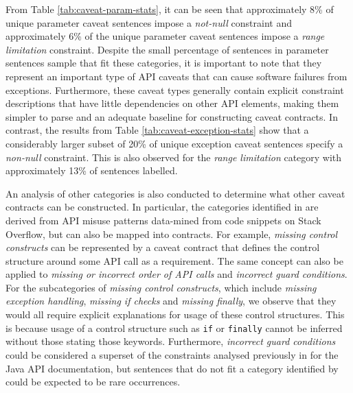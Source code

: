 From Table \ref{tab:caveat-param-stats}, it can be seen that approximately 8\% of unique parameter caveat sentences impose a \textit{not-null} constraint and approximately 6\% of the unique parameter caveat sentences impose a \textit{range limitation} constraint. Despite the small percentage of sentences in parameter sentences sample that fit these categories, it is important to note that they represent an important type of API caveats that can cause software failures from exceptions. Furthermore, these caveat types generally contain explicit constraint descriptions that have little dependencies on other API elements, making them simpler to parse and an adequate baseline for constructing caveat contracts. In contrast, the results from Table \ref{tab:caveat-exception-stats} show that a considerably larger subset of 20\% of unique exception caveat sentences specify a \textit{non-null} constraint. This is also observed for the \textit{range limitation} category with approximately 13\% of sentences labelled. \bigbreak

An analysis of other categories is also conducted to determine what other caveat contracts can be constructed. In particular, the categories identified in \cite{code-examples} are derived from API misuse patterns data-mined from code snippets on Stack Overflow, but can also be mapped into contracts. For example, \textit{missing control constructs} can be represented by a caveat contract that defines the control structure around some API call as a requirement. The same concept can also be applied to \textit{missing or incorrect order of API calls} and \textit{incorrect guard conditions}. For the subcategories of \textit{missing control constructs}, which include \textit{missing exception handling}, \textit{missing if checks} and \textit{missing finally}, we observe that they would all require explicit explanations for usage of these control structures. This is because usage of a control structure such as \lstinline{if} or \lstinline{finally} cannot be inferred without those stating those keywords. Furthermore, \textit{incorrect guard conditions} could be considered a superset of the constraints analysed previously in \cite{zhou-directive} for the Java API documentation, but sentences that do not fit a category identified by \cite{zhou-directive} could be expected to be rare occurrences. \bigbreak

